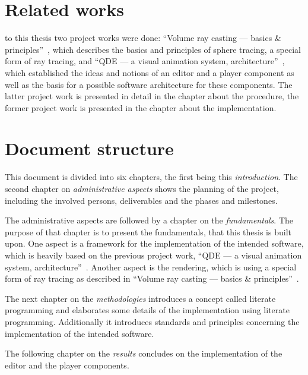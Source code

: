 \documentclass[%
    a4paper,
    nobib,   %
    openany  %
]{tufte-book}
\begin{document}
\section{Related works}
\label{sec:related-works}

 to this thesis two project works were done:
\enquote{Volume ray casting --- basics \&
principles}~\cite{osterwalder_volume_2016}, which describes the basics and
principles of sphere tracing, a special form of ray tracing, and \enquote{QDE
--- a visual animation system, architecture}~\cite{osterwalder_qde_2016}, which
established the ideas and notions of an editor and a player component as well as
the basis for a possible software architecture for these components. The latter
project work is presented in detail in the chapter about the procedure, the
former project work is presented in the chapter about the implementation.

\section{Document structure}
\label{sec:document-structure}

This document is divided into six chapters, the first being this \textit{introduction}. The
second chapter on \textit{administrative aspects} shows the planning of the
project, including the involved persons, deliverables and the phases and
milestones.

The administrative aspects are followed by a chapter on the
\textit{fundamentals}. The purpose of that chapter is to present the
fundamentals, that this thesis is built upon. One aspect is a framework for the
implementation of the intended software, which is heavily based on the previous
project work, \enquote{QDE --- a visual animation system, architecture}~\cite{osterwalder_qde_2016}. Another aspect is the rendering,
which is using a special form of ray tracing as described in ``Volume ray
casting --- basics \& principles''~\cite{osterwalder_volume_2016}.

The next chapter on the \textit{methodologies} introduces a concept called
literate programming and elaborates some details of the implementation using
literate programming. Additionally it introduces standards and principles
concerning the implementation of the intended software.

The following chapter on the \textit{results} concludes on the implementation
of the editor and the player components.
\end{document}
